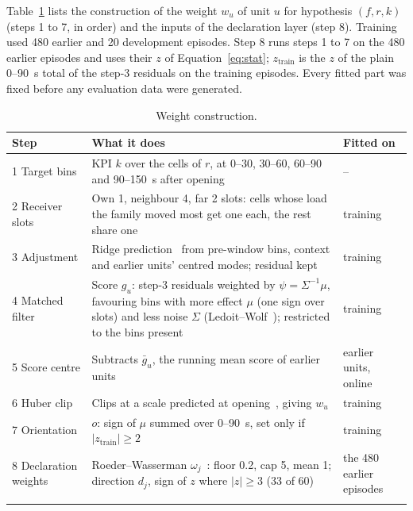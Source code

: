 Table~\ref{tab:pipeline} lists the construction of the weight $w_u$ of unit $u$ for hypothesis $(f, r, k)$ (steps 1 to 7, in order) and the inputs of the declaration layer (step 8). Training used 480 earlier and 20 development episodes. Step 8 runs steps 1 to 7 on the 480 earlier episodes and uses their $z$ of Equation~\eqref{eq:stat}; $z_{\mathrm{train}}$ is the $z$ of the plain 0--90~s total of the step-3 residuals on the training episodes. Every fitted part was fixed before any evaluation data were generated.

\begin{table}[tbp]
\caption{Weight construction.}
\label{tab:pipeline}
\footnotesize
\setlength{\tabcolsep}{3pt}
\begin{tabular*}{\textwidth}{@{\extracolsep{\fill}}>{\raggedright}p{}>{\raggedright}p{}>{\raggedright\arraybackslash}p{}@{}}
\toprule
Step & What it does & Fitted on \\
\midrule
1 Target bins & KPI $k$ over the cells of $r$, at 0--30, 30--60, 60--90 and 90--150~s after opening & -- \\
2 Receiver slots & Own 1, neighbour 4, far 2 slots: cells whose load the family moved most get one each, the rest share one & training \\
3 Adjustment & Ridge prediction~\cite{hoerl1970ridge} from pre-window bins, context and earlier units' centred modes; residual kept & training \\
4 Matched filter & Score $g_u$: step-3 residuals weighted by $\psi = \Sigma^{-1} \mu$, favouring bins with more effect $\mu$ (one sign over slots) and less noise $\Sigma$ (Ledoit--Wolf~\cite{ledoit2004covariance}); restricted to the bins present & training \\
5 Score centre & Subtracts $\bar g_u$, the running mean score of earlier units & earlier units, online \\
6 Huber clip & Clips at a scale predicted at opening~\cite{huber1964robust}, giving $w_u$ & training \\
7 Orientation & $o$: sign of $\mu$ summed over 0--90~s, set only if $|z_{\mathrm{train}}| \ge 2$ & training \\
\midrule
8 Declaration weights & Roeder--Wasserman $\omega_j$~\cite{roeder2009weighted}: floor 0.2, cap 5, mean 1; direction $d_j$, sign of $z$ where $|z| \ge 3$ (33 of 60) & the 480 earlier episodes \\
\botrule
\end{tabular*}
\end{table}

